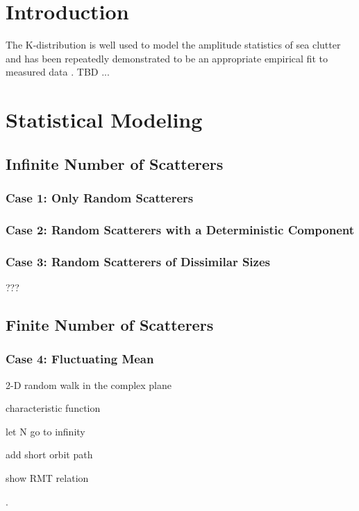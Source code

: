 \documentclass[12pt,twoside]{paper}
\begin{document}
\section{Introduction}
The K-distribution is well used to model the amplitude statistics of sea clutter and has been repeatedly demonstrated to be an appropriate empirical fit to measured data \cite{ward_sea_clutter}. TBD ...

\section{Statistical Modeling}

\subsection{Infinite Number of Scatterers}

\subsubsection{Case 1: Only Random Scatterers}

\subsubsection{Case 2: Random Scatterers with a Deterministic Component}

\subsubsection{Case 3: Random Scatterers of Dissimilar Sizes}
???

\subsection{Finite Number of Scatterers}
\subsubsection{Case 4: Fluctuating Mean}

2-D random walk in the complex plane

characteristic function

let N go to infinity

add short orbit path

show RMT relation

\cite{jakeman_significance} \cite{jakeman_generalized} \cite{jakeman_model_non_rayleigh}.

\cite{yeh_fading} \cite{yeh_first_principles}

\cite{hart_so} \cite{yeh_universal}

\cite{zheng_single}


     

\end{document}
